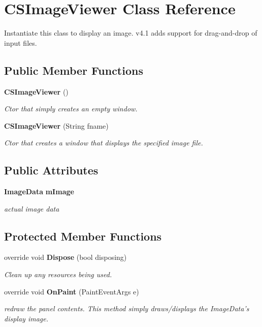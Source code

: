 \section{CSImage\-Viewer Class Reference}
\label{class_c_s_image_viewer_1_1_c_s_image_viewer}
Instantiate this class to display an image. v4.1 adds support for drag-and-drop of input files.  


\subsection*{Public Member Functions}
\begin{CompactItemize}
\item 
{\bf CSImage\-Viewer} ()
\begin{CompactList}\small\item\em Ctor that simply creates an empty window. \item\end{CompactList}\item 
{\bf CSImage\-Viewer} (String fname)
\begin{CompactList}\small\item\em Ctor that creates a window that displays the specified image file. \item\end{CompactList}\end{CompactItemize}
\subsection*{Public Attributes}
\begin{CompactItemize}
\item 
{\bf Image\-Data} {\bf m\-Image}
\begin{CompactList}\small\item\em actual image data \item\end{CompactList}\end{CompactItemize}
\subsection*{Protected Member Functions}
\begin{CompactItemize}
\item 
override void {\bf Dispose} (bool disposing)
\begin{CompactList}\small\item\em Clean up any resources being used. \item\end{CompactList}\item 
override void {\bf On\-Paint} (Paint\-Event\-Args e)
\begin{CompactList}\small\item\em redraw the panel contents. This method simply draws/displays the Image\-Data's display image. \item\end{CompactList}\end{CompactItemize}
